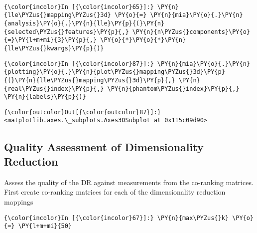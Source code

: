     \begin{center}
    \end{center}
    { \hspace*{\fill} \\}

    \begin{Verbatim}[commandchars=\\\{\}]
{\color{incolor}In [{\color{incolor}65}]:} \PY{n}{lle\PYZus{}mapping\PYZus{}3d} \PY{o}{=} \PY{n}{mia}\PY{o}{.}\PY{n}{analysis}\PY{o}{.}\PY{n}{lle}\PY{p}{(}\PY{n}{selected\PYZus{}features}\PY{p}{,} \PY{n}{n\PYZus{}components}\PY{o}{=}\PY{l+m+mi}{3}\PY{p}{,} \PY{o}{*}\PY{o}{*}\PY{n}{lle\PYZus{}kwargs}\PY{p}{)}
\end{Verbatim}

    \begin{Verbatim}[commandchars=\\\{\}]
{\color{incolor}In [{\color{incolor}87}]:} \PY{n}{mia}\PY{o}{.}\PY{n}{plotting}\PY{o}{.}\PY{n}{plot\PYZus{}mapping\PYZus{}3d}\PY{p}{(}\PY{n}{lle\PYZus{}mapping\PYZus{}3d}\PY{p}{,} \PY{n}{real\PYZus{}index}\PY{p}{,} \PY{n}{phantom\PYZus{}index}\PY{p}{,} \PY{n}{labels}\PY{p}{)}
\end{Verbatim}

            \begin{Verbatim}[commandchars=\\\{\}]
{\color{outcolor}Out[{\color{outcolor}87}]:} <matplotlib.axes.\_subplots.Axes3DSubplot at 0x115c09d90>
\end{Verbatim}

    \subsection{Quality Assessment of Dimensionality
Reduction}\label{quality-assessment-of-dimensionality-reduction}

    Assess the quality of the DR against measurements from the co-ranking
matrices. First create co-ranking matrices for each of the
dimensionality reduction mappings

    \begin{Verbatim}[commandchars=\\\{\}]
{\color{incolor}In [{\color{incolor}67}]:} \PY{n}{max\PYZus{}k} \PY{o}{=} \PY{l+m+mi}{50}
\end{Verbatim}

